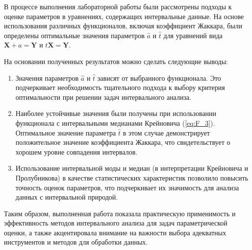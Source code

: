 \documentclass{article}
\begin{document}
  В процессе выполнения лабораторной работы были рассмотрены подходы к оценке параметров в уравнениях, содержащих интервальные данные. На основе использования различных функционалов, включая коэффициент Жаккара, были определены оптимальные значения параметров \( \hat{a} \) и \( \hat{t} \) для уравнений вида \( \mathbf{X} + a = \mathbf{Y} \) и \( t\mathbf{X} = \mathbf{Y} \).
  
  На основании полученных результатов можно сделать следующие выводы:
  
  \begin{enumerate}
      \item Значения параметров \( \hat{a} \) и \( \hat{t} \) зависят от выбранного функционала. Это подчеркивает необходимость тщательного подхода к выбору критерия оптимальности при решении задач интервального анализа.
      \item Наиболее устойчивые значения были получены при использовании функционала с интервальными медианами Крейновича (\ref{eq:F_3}). Оптимальное значение параметра \( \hat{t} \) в этом случае демонстрирует положительное значение коэффициента Жаккара, что свидетельствует о хорошем уровне совпадения интервалов.
      \item Использование интервальной моды и медиан (в интерпретации Крейновича и Пролубникова) в качестве статистических характеристик позволило повысить точность оценок параметров, что подчеркивает их значимость для анализа данных с интервальной природой.
  \end{enumerate}
  
  Таким образом, выполненная работа показала практическую применимость и эффективность методов интервального анализа для задач параметрической оценки, а также акцентировала внимание на важности выбора адекватных инструментов и методов для обработки данных.
\end{document}
